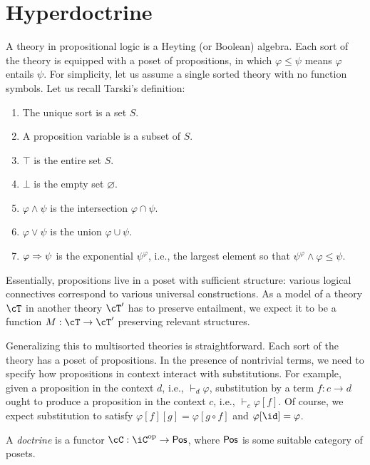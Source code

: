 \documentclass[article,10pt,oneside]{memoir}
\begin{document}
\section{Hyperdoctrine}
\label{sec:hyperdoctrine}

A theory in propositional logic is a Heyting (or Boolean) algebra.
Each sort of the theory is equipped with a poset of propositions, in which $\varphi \leq \psi$ means $\varphi$ entails $\psi$.
For simplicity, let us assume a single sorted theory with no function symbols.
Let us recall Tarski's definition:
\begin{enumerate}
\item The unique sort is a set $S$.
\item A proposition variable is a subset of $S$.
\item $\top$ is the entire set $S$.
\item $\bot$ is the empty set $\varnothing$.
\item $\varphi \wedge \psi$ is the intersection $\varphi \cap \psi$.
\item $\varphi \vee \psi$ is the union $\varphi \cup \psi$.
\item $\varphi \Rightarrow \psi$ is the exponential $\psi^{\varphi}$, i.e., the largest element so that $\psi^{\varphi} \wedge \varphi \leq \psi$.
\end{enumerate}

Essentially, propositions live in a poset with sufficient structure: various logical connectives correspond to various universal constructions.
As a model of a theory $\cT$ in another theory $\cT'$ has to preserve entailment, we expect it to be a function $M : \cT \to \cT'$ preserving relevant structures.

Generalizing this to multisorted theories is straightforward.
Each sort of the theory has a poset of propositions.
In the presence of nontrivial terms, we need to specify how propositions in context interact with substitutions.
For example, given a proposition in the context $d$, i.e., $\vdash_{d} \varphi$, substitution by a term $f : c \to d$ ought to produce a proposition in the context $c$, i.e., $\vdash_{c} \varphi[f]$.
Of course, we expect substitution to satisfy $\varphi[f][g] = \varphi[g \circ f]$ and $\varphi[\id] = \varphi$.

\begin{defn}
  A \emph{doctrine} is a functor $\cC : \iC\op \to \CPos$, where $\mathsf{Pos}$ is some suitable category of posets.
\end{defn}
\end{document}
